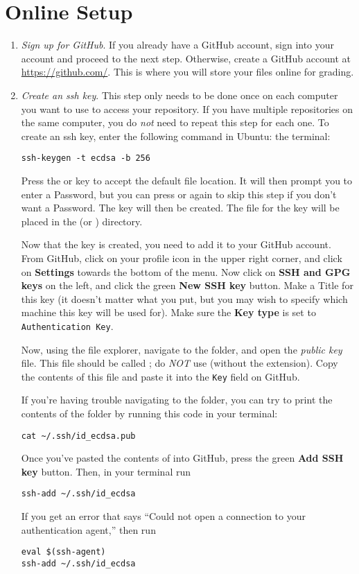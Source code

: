 \section*{Online Setup}
\begin{enumerate}
    \item \emph{Sign up for GitHub}.
    \label{step:sign-up}
    If you already have a GitHub account, sign into your account and proceed to the next step.
    Otherwise, create a GitHub account at \url{https://github.com/}.
    This is where you will store your files online for grading.
  
    \item \emph{Create an ssh key}.
    This step only needs to be done once on each computer you want to use to access your repository.
    If you have multiple repositories on the same computer, you do \emph{not} need to repeat this step for each one.
    To create an ssh key, enter the following command in
    \ifwindows
    Ubuntu:
    \else
    the terminal:
    \fi
\begin{lstlisting}
ssh-keygen -t ecdsa -b 256
\end{lstlisting}
    Press the  or  key to accept the default file location.
    It will then prompt you to enter a Password, but you can press  or  again to skip this step if you don't want a Password.
    The key will then be created.
    The file for the key will be placed in the  (or ) directory.
  
    Now that the key is created, you need to add it to your GitHub account.
    From GitHub, click on your profile icon in the upper right corner, and click on \textbf{Settings} towards the bottom of the menu.
    Now click on \textbf{SSH and GPG keys} on the left, and click the green \textbf{New SSH key} button.
    Make a Title for this key (it doesn't matter what you put, but you may wish to specify which machine this key will be used for).
    Make sure the \textbf{Key type} is set to \texttt{Authentication Key}.

    Now, using the file explorer, navigate to the  folder, and open the \emph{public key} file.
    This file should be called ; do \emph{NOT} use  (without the  extension).
    Copy the contents of this file and paste it into the \texttt{Key} field on GitHub. 

    If you're having trouble navigating to the  folder, you can try to print the contents of the folder by running this code in your terminal:
\begin{lstlisting}
cat ~/.ssh/id_ecdsa.pub 
\end{lstlisting}
    Once you've pasted the contents of  into GitHub, press the green \textbf{Add SSH key} button.
    Then, in your terminal run 
\begin{lstlisting}
ssh-add ~/.ssh/id_ecdsa 
\end{lstlisting}
    If you get an error that says ``Could not open a connection to your authentication agent,'' then run 
\begin{lstlisting}
eval $(ssh-agent)
ssh-add ~/.ssh/id_ecdsa 
\end{lstlisting}


\end{enumerate}
